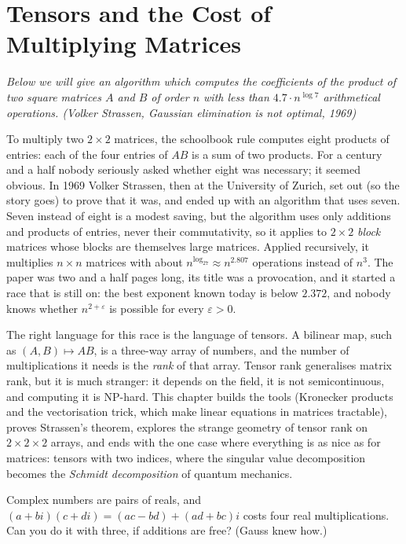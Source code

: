 \chapter{Tensors and the Cost of Multiplying Matrices}\label{ch:tensors}

\begin{center}\itshape
Below we will give an algorithm which computes the coefficients of the product of two square matrices $A$ and $B$ of order $n$
with less than $4.7\cdot n^{\log7}$ arithmetical operations.
\upshape(Volker Strassen, \emph{Gaussian elimination is not optimal}, 1969)
\end{center}

To multiply two $2\times2$ matrices, the schoolbook rule computes eight products of entries: each of the four entries of $AB$ is
a sum of two products. For a century and a half nobody seriously asked whether eight was necessary; it seemed obvious. In 1969
Volker Strassen, then at the University of Zurich, set out (so the story goes) to prove that it was, and ended up with an
algorithm that uses seven. Seven instead of eight is a modest saving, but the algorithm uses only additions and
products of entries, never their commutativity, so it applies to $2\times2$ \emph{block} matrices whose blocks are themselves large
matrices. Applied recursively, it multiplies $n\times n$ matrices with about $n^{\log_27}\approx n^{2.807}$ operations instead of
$n^3$. The paper was two and a half pages long, its title was a provocation, and it started a race that is still on: the best
exponent known today is below $2.372$, and nobody knows whether $n^{2+\varepsilon}$ is possible for every $\varepsilon>0$.

The right language for this race is the language of tensors. A bilinear map, such as $(A,B)\mapsto AB$, is a three-way array of
numbers, and the number of multiplications it needs is the \emph{rank} of that array. Tensor rank generalises matrix rank, but it
is much stranger: it depends on the field, it is not semicontinuous, and computing it is NP-hard. This chapter builds the
tools (Kronecker products and the vectorisation trick, which make linear equations in matrices tractable), proves Strassen's
theorem, explores the strange geometry of tensor rank on $2\times2\times2$ arrays, and ends with the one case where everything
is as nice as for matrices: tensors with two indices, where the singular value decomposition becomes the \emph{Schmidt
decomposition} of quantum mechanics.

\begin{think}
Complex numbers are pairs of reals, and $(a+bi)(c+di)=(ac-bd)+(ad+bc)i$ costs four real multiplications. Can you do it with
three, if additions are free? (Gauss knew how.)
\end{think}

